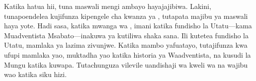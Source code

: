 Katika hatua hii, tuna maswali mengi ambayo hayajajibiwa. Lakini, tunapoendelea kujifunza kipengele cha kwanza ya , tutapata majibu ya maswali haya yote. Hadi sasa, katika mwanga wa , imani katika fundisho la Utatu—kama Muadventista Msabato—inakuwa ya kutiliwa shaka sana. Ili kutetea fundisho la Utatu, mamlaka ya  lazima zivunjwe. Katika mambo yafuatayo, tutajifunza kwa ufupi mamlaka yao, muktadha yao katika historia ya Waadventista, na kusudi la Mungu katika kuwapa. Tutachunguza vilevile uandishaji wa kweli wa  na wajibu wao katika siku hizi.







